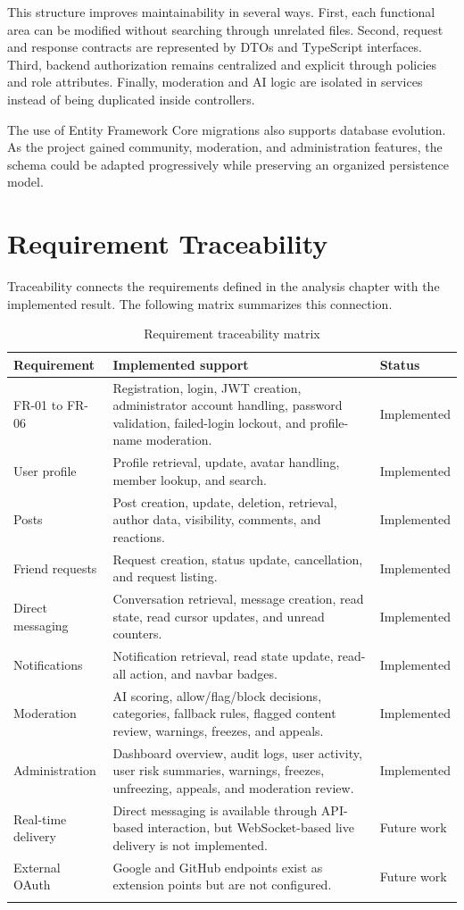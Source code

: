 This structure improves maintainability in several ways. First, each functional area can be modified without searching through unrelated files. Second, request and response contracts are represented by DTOs and TypeScript interfaces. Third, backend authorization remains centralized and explicit through policies and role attributes. Finally, moderation and AI logic are isolated in services instead of being duplicated inside controllers.

The use of Entity Framework Core migrations also supports database evolution. As the project gained community, moderation, and administration features, the schema could be adapted progressively while preserving an organized persistence model.

\section{Requirement Traceability}

Traceability connects the requirements defined in the analysis chapter with the implemented result. The following matrix summarizes this connection.

\begin{longtable}{|m{3cm}|m{7cm}|m{4.5cm}|}
\hline
\textbf{Requirement} & \textbf{Implemented support} & \textbf{Status} \\
\hline
FR-01 to FR-06 & Registration, login, JWT creation, administrator account handling, password validation, failed-login lockout, and profile-name moderation. & Implemented \\
\hline
User profile & Profile retrieval, update, avatar handling, member lookup, and search. & Implemented \\
\hline
Posts & Post creation, update, deletion, retrieval, author data, visibility, comments, and reactions. & Implemented \\
\hline
Friend requests & Request creation, status update, cancellation, and request listing. & Implemented \\
\hline
Direct messaging & Conversation retrieval, message creation, read state, read cursor updates, and unread counters. & Implemented \\
\hline
Notifications & Notification retrieval, read state update, read-all action, and navbar badges. & Implemented \\
\hline
Moderation & AI scoring, allow/flag/block decisions, categories, fallback rules, flagged content review, warnings, freezes, and appeals. & Implemented \\
\hline
Administration & Dashboard overview, audit logs, user activity, user risk summaries, warnings, freezes, unfreezing, appeals, and moderation review. & Implemented \\
\hline
Real-time delivery & Direct messaging is available through API-based interaction, but WebSocket-based live delivery is not implemented. & Future work \\
\hline
External OAuth & Google and GitHub endpoints exist as extension points but are not configured. & Future work \\
\hline
\caption{Requirement traceability matrix}\\
\end{longtable}

